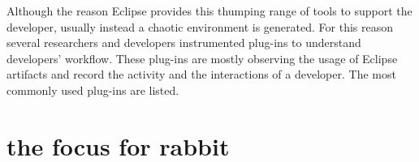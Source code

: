 Although the reason Eclipse provides this thumping range of tools to support the developer, usually instead a chaotic environment is generated. For this reason several researchers and developers instrumented plug-ins to understand developers' workflow. These plug-ins are mostly observing the usage of Eclipse artifacts and record the activity and the interactions of a developer. The most commonly used plug-ins are listed. 

\section{the focus for rabbit}
\label{sec:TheEclipseIDE:rabbit}
